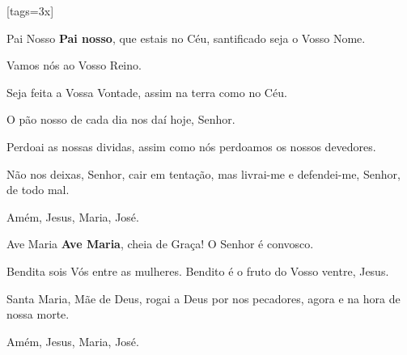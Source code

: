     \begin{songs}{}
      \renewcommand{\thesongnum}{\Roman{songnum}}
      \setcounter{songnum}{1}

      [tags={3x}]
        \vspace*{6ex}
        \begin{passage}[PT]{Pai Nosso}
          \textbf{Pai nosso},
          que estais no Céu,
          santificado seja o Vosso Nome.
          \par
          Vamos nós ao Vosso Reino.
          \par
          Seja feita a Vossa Vontade,
          assim na terra como no Céu.
          \par
          O pão nosso de cada dia nos daí hoje, Senhor.
          \par
          Perdoai as nossas dividas,
          assim como nós perdoamos os nossos devedores.
          \par
          Não nos deixas, Senhor, cair em tentação,
          mas livrai-me e defendei-me, Senhor,
          de todo mal.
          \par
          Amém, Jesus, Maria, José.
        \end{passage}
        \begin{passage}[PT]{Ave Maria}
          \textbf{Ave Maria},
          cheia de Graça!
          O Senhor é convosco.
          \par
          Bendita sois Vós entre as mulheres.
          Bendito é o fruto do Vosso ventre, Jesus.
          \par
          Santa Maria, Mãe de Deus,
          rogai a Deus por nos pecadores,
          agora e na hora de nossa morte.
          \par
          Amém, Jesus, Maria, José.
        \end{passage}
        \vspace{\fill}

\end{songs}
